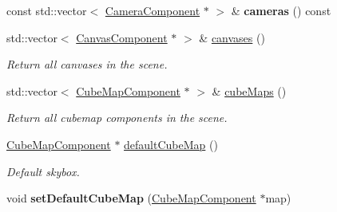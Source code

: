 \begin{Indent}
\begin{DoxyCompactItemize}
\mbox{\label{classrev_1_1_scene_a07e6b225d513f53dd34ae4bc9825fb7b}} 
const std\+::vector$<$ \mbox{\hyperlink{classrev_1_1_camera_component}{Camera\+Component}} $\ast$ $>$ \& {\bfseries cameras} () const
\item 
\mbox{\label{classrev_1_1_scene_aeeffe5fed10af2409c2b116e3db7a306}} 
std\+::vector$<$ \mbox{\hyperlink{classrev_1_1_canvas_component}{Canvas\+Component}} $\ast$ $>$ \& \mbox{\hyperlink{classrev_1_1_scene_aeeffe5fed10af2409c2b116e3db7a306}{canvases}} ()
\begin{DoxyCompactList}\small\item\em Return all canvases in the scene. \end{DoxyCompactList}\item 
\mbox{\label{classrev_1_1_scene_ab14c73e1c955993c3efafc22651b593a}} 
std\+::vector$<$ \mbox{\hyperlink{classrev_1_1_cube_map_component}{Cube\+Map\+Component}} $\ast$ $>$ \& \mbox{\hyperlink{classrev_1_1_scene_ab14c73e1c955993c3efafc22651b593a}{cube\+Maps}} ()
\begin{DoxyCompactList}\small\item\em Return all cubemap components in the scene. \end{DoxyCompactList}\item 
\mbox{\label{classrev_1_1_scene_ad1b65794224cab17fee34e9f752941a4}} 
\mbox{\hyperlink{classrev_1_1_cube_map_component}{Cube\+Map\+Component}} $\ast$ \mbox{\hyperlink{classrev_1_1_scene_ad1b65794224cab17fee34e9f752941a4}{default\+Cube\+Map}} ()
\begin{DoxyCompactList}\small\item\em Default skybox. \end{DoxyCompactList}\item 
\mbox{\label{classrev_1_1_scene_a94d87146dc535d166b654754c86fb788}} 
void {\bfseries set\+Default\+Cube\+Map} (\mbox{\hyperlink{classrev_1_1_cube_map_component}{Cube\+Map\+Component}} $\ast$map)
\end{DoxyCompactItemize}
\end{Indent}
